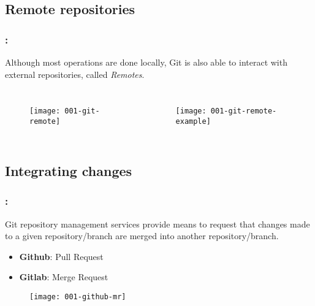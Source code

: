 \subsection{Remote repositories}

\begin{frame}
    \frametitle{\secname: \small\subsecname\normalsize}

    Although most operations are done locally, Git is also able to interact with external repositories, called \textit{Remotes}.

    \begin{columns}
        \begin{figure}[h]
            \texttt{[image: 001-git-remote]}
            \centering
        \end{figure}

        \begin{figure}[h]
            \texttt{[image: 001-git-remote-example]}
            \centering
        \end{figure}
    \end{columns}
\end{frame}

\subsection{Integrating changes}

\begin{frame}
    \frametitle{\secname: \small\subsecname\normalsize}

    Git repository management services provide means to request that changes made to a given repository/branch are merged into another repository/branch.

    \begin{itemize}
        \item \textbf{Github}: Pull Request
        \item \textbf{Gitlab}: Merge Request
    \end{itemize}

    \begin{figure}[h]
        \texttt{[image: 001-github-mr]}
        \centering
    \end{figure}
\end{frame}

